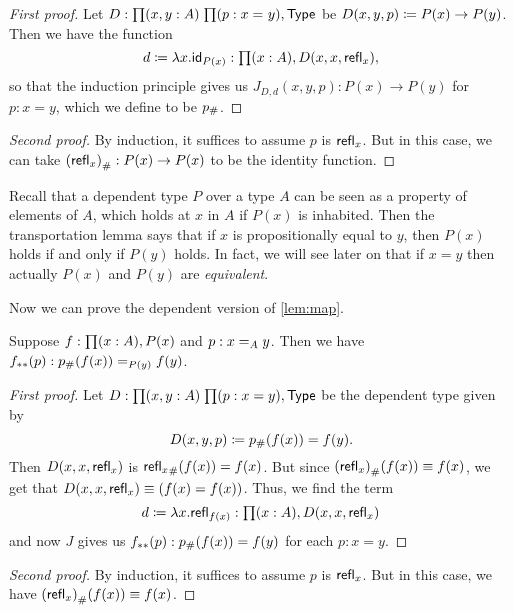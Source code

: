 \begin{proof}[First proof]
  Let $D:\prd{x,y:A}{p:\id{x}{y}} \type$ be $D(x,y,p)\defeq P(x)\to P(y)$.
  Then we have the function
  \begin{equation*}
    d\defeq\lambda x.\idfunc[P(x)]:\prd{x:A} D(x,x,\refl{x}),
  \end{equation*}
  so that the induction principle gives us $J_{D,d}(x,y,p):P(x)\to P(y)$ for $p:x= y$, which we define to be $\transf p$.
\end{proof}

\begin{proof}[Second proof]
  By induction, it suffices to assume $p$ is $\refl x$.
  But in this case, we can take $\transf{(\refl x)}:P(x)\to P(x)$ to be the identity function.
\end{proof}

Recall that a dependent type $P$ over a type $A$ can be seen as a property of elements of $A$, which holds at $x$ in $A$ if $P(x)$ is inhabited.
Then the transportation lemma says that if $x$ is propositionally equal to $y$, then $P(x)$ holds if and only if $P(y)$ holds.
In fact, we will see later on that if $x=y$ then actually $P(x)$ and $P(y)$ are \emph{equivalent}.

Now we can prove the dependent version of \autoref{lem:map}.

\begin{lem}\label{lem:mapdep}
  Suppose $f:\prd{x: A} P(x)$ and $p:\id[A]xy$.
  Then we have $\mapdep fp:\id[P(y)]{\trans p{f(x)}}{f(y)}$.
\end{lem}

\begin{proof}[First proof]
  Let $D:\prd{x,y:A}{p:x=y} \type$ be the dependent type given by
  \begin{equation*}
    D(x,y,p)\defeq \trans p {f(x)}= f(y).
  \end{equation*}
  Then $D(x,x,\refl{x})$ is $\trans{\refl{x}}{f(x)}= f(x)$.
  But since $\trans{(\refl{x})}{f(x)}\jdeq f(x)$, we get that $D(x,x,\refl{x})\jdeq (f(x)= f(x))$.
  Thus, we find the term
  \begin{equation*}
    d\defeq\lambda x.\refl{f(x)}:\prd{x:A} D(x,x,\refl{x})
  \end{equation*}
  and now $J$ gives us $\mapdep fp:\trans p{f(x)}= f(y)$ for each $p:x= y$.
\end{proof}

\begin{proof}[Second proof]
  By induction, it suffices to assume $p$ is $\refl x$.
  But in this case, we have $\trans{(\refl{x})}{f(x)}\jdeq f(x)$.
\end{proof}

